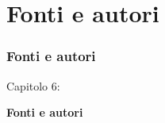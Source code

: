 %

\section{Fonti e autori}
\begin{frame}[fragile]
	\frametitle{Fonti e autori}

	\begin{center}\huge{Capitolo 6:}\end{center}
	\begin{center}\huge{\color{typo3darkgrey}\textbf{Fonti e autori}}\end{center}

\end{frame}


